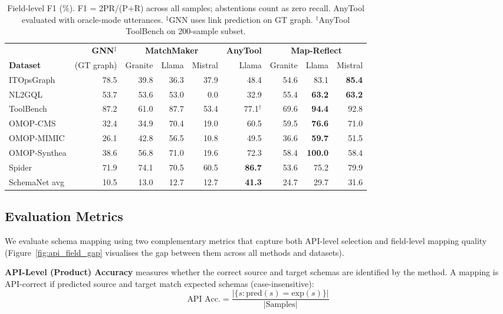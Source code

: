 \documentclass[sigconf, nonacm]{acmart}
\begin{document}
\begin{table}[htbp]
\centering
\small
\setlength{\tabcolsep}{5pt}
\caption{Field-level F1 (\%). F1 = 2PR/(P+R) across all samples; abstentions count as zero recall. AnyTool evaluated with oracle-mode utterances. $^\ddagger$GNN uses link prediction on GT graph. $^\dagger$AnyTool ToolBench on 200-sample subset.}
\label{tab:field_results}
\begin{tabular}{l r rrr r rrr}
\toprule
& \textbf{GNN}$^\ddagger$ & \multicolumn{3}{c}{\textbf{MatchMaker}} & \textbf{AnyTool} & \multicolumn{3}{c}{\textbf{Map-Reflect}} \\
\cmidrule(lr){2-2}\cmidrule(lr){3-5}\cmidrule(lr){6-6}\cmidrule(lr){7-9}
\textbf{Dataset} & (GT graph) & Granite & Llama & Mistral & Llama & Granite & Llama & Mistral \\
\midrule
ITOpsGraph        & 78.5 & 39.8  & 36.3  & 37.9  & 48.4  & 54.6  & 83.1  & \textbf{85.4} \\
NL2GQL            & 53.7 & 53.6  & 53.0  & 0.0   & 32.9  & 55.4  & \textbf{63.2}  & \textbf{63.2} \\
ToolBench         & 87.2 & 61.0  & 87.7  & 53.4  & 77.1$^\dagger$  & 69.6  & \textbf{94.4}  & 92.8 \\
OMOP-CMS          & 32.4 & 34.9  & 70.4  & 19.0  & 60.5  & 59.5  & \textbf{76.6}  & 71.0 \\
OMOP-MIMIC        & 26.1 & 42.8  & 56.5  & 10.8  & 49.5  & 36.6  & \textbf{59.7}  & 51.5 \\
OMOP-Synthea      & 38.6 & 56.8  & 71.0  & 19.6  & 72.3  & 58.4  & \textbf{100.0} & 58.4 \\
Spider            & 71.9  & 74.1 & 70.5  & 60.5  & \textbf{86.7}  & 53.6  & 75.2  & 79.9 \\
SchemaNet avg     & 10.5 & 13.0  & 12.7  & 12.7  & \textbf{41.3}  & 24.7  & 29.7  & 31.6 \\
\bottomrule
\end{tabular}
\end{table}

\subsection{Evaluation Metrics}

We evaluate schema mapping using two complementary metrics that capture both API-level selection and field-level mapping quality (Figure~\ref{fig:api_field_gap} visualises the gap between them across all methods and datasets).

\textbf{API-Level (Product) Accuracy} measures whether the correct source and target schemas are identified by the method. A mapping is API-correct if predicted source and target match expected schemas (case-insensitive):
\begin{equation}
\text{API Acc.} = \frac{|\{s : \text{pred}(s) = \text{exp}(s)\}|}{|\text{Samples}|}
\end{equation}
\end{document}
